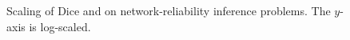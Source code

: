 \begin{figure}


\caption{Scaling of Dice and \PLang on network-reliability inference problems.
The $y$-axis is log-scaled.}
\label{fig:eval-grid}
\end{figure}

\let\pgfplotwidth\relax
\let\pgfplotheight\relax
